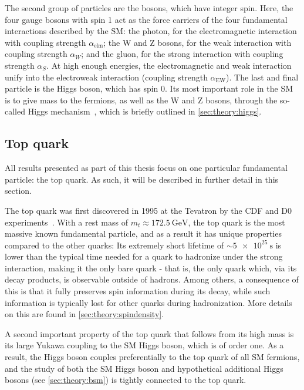 The second group of particles are the bosons, which have integer spin. Here, the four gauge bosons with spin 1 act as the force carriers of the four fundamental interactions described by the SM: the photon, for the electromagnetic interaction with coupling strength $\alpha_{\mathrm{elm}}$; the W and Z bosons, for the weak interaction with coupling strength $\alpha_W$; and the gluon, for the strong interaction with coupling strength $\alpha_S$. At high enough energies, the electromagnetic and weak interaction unify into the electroweak interaction (coupling strength $\alpha_{\mathrm{EW}}$). The last and final particle is the Higgs boson, which has spin 0. Its most important role in the SM is to give mass to the fermions, as well as the W and Z bosons, through the so-called Higgs mechanism~\cite{Higgs:1964ia,Englert:1964et}, which is briefly outlined in \cref{sec:theory:higgs}.

\subsection{Top quark}

All results presented as part of this thesis focus on one particular fundamental particle: the top quark. As such, it will be described in further detail in this section.

The top quark was first discovered in 1995 at the Tevatron by the CDF and D0 experiments~\cite{CDF:1995wbb,D0:1995jca}. With a rest mass of $m_t \approx \SI{172.5}{\GeV}$, the top quark is the most massive known fundamental particle, and as a result it has unique properties compared to the other quarks: Its extremely short lifetime of $\sim \SI{5e25}{\s}$ is lower than the typical time needed for a quark to hadronize under the strong interaction, making it the only bare quark - that is, the only quark which,  via its decay products, is observable outside of hadrons. Among others, a consequence of this is that it fully preserves spin information during its decay, while such information is typically lost for other quarks during hadronization. More details on this are found in \cref{sec:theory:spindensity}.

A second important property of the top quark that follows from its high mass is its large Yukawa coupling to the SM Higgs boson, which is of order one. As a result, the Higgs boson couples preferentially to the top quark of all SM fermions, and the study of both the SM Higgs boson and hypothetical additional Higgs bosons (see \cref{sec:theory:bsm}) is tightly connected to the top quark. 


